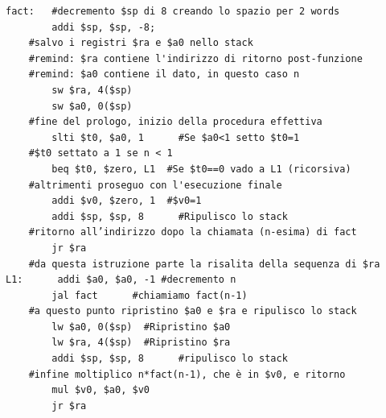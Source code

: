 \documentclass[class=book, crop=false]{standalone}
\begin{document}
\begin{verbatim}
fact:   #decremento $sp di 8 creando lo spazio per 2 words
		addi $sp, $sp, -8;
	#salvo i registri $ra e $a0 nello stack
	#remind: $ra contiene l'indirizzo di ritorno post-funzione
	#remind: $a0 contiene il dato, in questo caso n
		sw $ra, 4($sp)
		sw $a0, 0($sp)
	#fine del prologo, inizio della procedura effettiva
		slti $t0, $a0, 1	  #Se $a0<1 setto $t0=1
	#$t0 settato a 1 se n < 1
		beq $t0, $zero, L1	#Se $t0==0 vado a L1 (ricorsiva)
	#altrimenti proseguo con l'esecuzione finale
		addi $v0, $zero, 1	#$v0=1
		addi $sp, $sp, 8	  #Ripulisco lo stack
	#ritorno all’indirizzo dopo la chiamata (n-esima) di fact
		jr $ra
	#da questa istruzione parte la risalita della sequenza di $ra
L1:	     addi $a0, $a0, -1 #decremento n
		jal fact	  #chiamiamo fact(n-1)
	#a questo punto ripristino $a0 e $ra e ripulisco lo stack
		lw $a0, 0($sp)	#Ripristino $a0
		lw $ra, 4($sp)	#Ripristino $ra
		addi $sp, $sp, 8      #ripulisco lo stack
	#infine moltiplico n*fact(n-1), che è in $v0, e ritorno
		mul $v0, $a0, $v0
		jr $ra
\end{verbatim}
\end{document}
